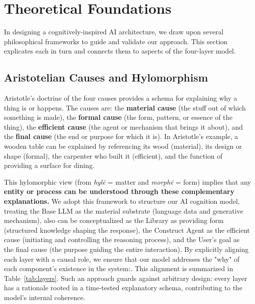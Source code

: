 \documentclass{article}
\begin{document}
\hrulefill{}

\section{Theoretical Foundations}\label{sec:foundations}
In designing a cognitively-inspired AI architecture, we draw upon several philosophical frameworks to guide and validate our approach. This section explicates each in turn and connects them to aspects of the four-layer model.

\subsection{Aristotelian Causes and Hylomorphism}
Aristotle's doctrine of the four causes provides a schema for explaining why a thing is or happens. The causes are: the \textbf{material cause} (the stuff out of which something is made), the \textbf{formal cause} (the form, pattern, or essence of the thing), the \textbf{efficient cause} (the agent or mechanism that brings it about), and the \textbf{final cause} (the end or purpose for which it is). In Aristotle's example, a wooden table can be explained by referencing its wood (material), its design or shape (formal), the carpenter who built it (efficient), and the function of providing a surface for dining. 

This hylomorphic view (from \emph{hylē} = matter and \emph{morphē} = form) implies that any \textbf{entity or process can be understood through these complementary explanations.} We adopt this framework to structure our AI cognition model, treating the Base LLM as the material substrate (language data and generative mechanism), also can be conceptualized as the Library as providing form (structured knowledge shaping the response), the Construct Agent as the efficient cause (initiating and controlling the reasoning process), and the User's goal as the final cause (the purpose guiding the entire interaction). By explicitly aligning each layer with a causal role, we ensure that our model addresses the "why" of each component's existence in the system:. This alignment is summarized in Table~\ref{tab:layers}. Such an approach guards against arbitrary design: every layer has a rationale rooted in a time-tested explanatory schema, contributing to the model's internal coherence.
\end{document}
